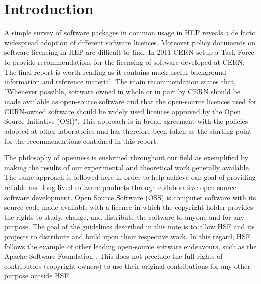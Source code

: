 \documentclass[12pt,a4paper]{article}
\begin{document}

\cleardoublepage

\renewcommand{\thefootnote}{\arabic{footnote}}
\setcounter{footnote}{0}


\pagestyle{plain} %
\setcounter{page}{1}


\section{Introduction}
\label{sec:Introduction}

A simple survey of software packages in common usage in HEP reveals a de facto widespread adoption of different software licences. Moreover policy documents on software licensing in HEP are difficult to find. In 2011 CERN setup a Task Force to provide recommendations for the licensing of software developed at CERN. The final report \cite{[1]} is worth reading as it contains much useful background information and reference material. The main recommendation states that, "Whenever possible, software owned in whole or in part by CERN should be made available as open-source software and that the open-source licences used for CERN-owned software should be widely used licences approved by the Open Source Initiative (OSI)". This approach is in broad agreement with the policies adopted at other laboratories and has therefore been taken as the starting point for the recommendations contained in this report.

The philosophy of openness is enshrined throughout our field as exemplified by making the results of our experimental and theoretical work generally available. The same approach is followed here in order to help achieve our goal of providing reliable and long-lived software products through collaborative open-source software development.  Open Source Software (OSS) is computer software with its source code made available with a licence in which the copyright holder provides the rights to study, change, and distribute the software to anyone and for any purpose. The goal of the guidelines described in this note is to allow HSF and its projects to distribute and build upon their respective work. In this regard, HSF follows the example of other leading open-source software endeavours, such as the Apache Software Foundation \cite{[2]}. This does not preclude the full rights of contributors (copyright owners) to use their original contributions for any other purpose outside HSF.
\end{document}

